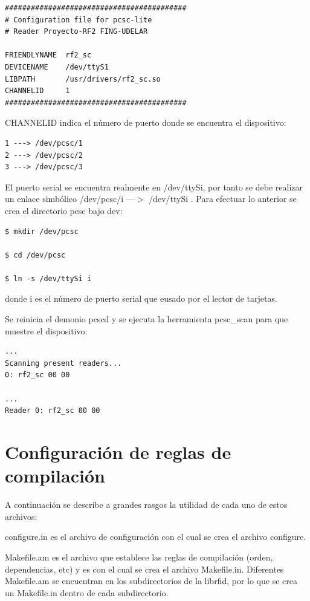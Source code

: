 \begin{verbatim}
##########################################
# Configuration file for pcsc-lite 
# Reader Proyecto-RF2 FING-UDELAR 

FRIENDLYNAME  rf2_sc 
DEVICENAME    /dev/ttyS1 
LIBPATH       /usr/drivers/rf2_sc.so 
CHANNELID     1 
##########################################
\end{verbatim}

CHANNELID indica el número de puerto donde se encuentra el dispositivo: 

\begin{verbatim}
1 ---> /dev/pcsc/1 
2 ---> /dev/pcsc/2 
3 ---> /dev/pcsc/3 
\end{verbatim}

El puerto serial se encuentra realmente en /dev/ttySi, por tanto se debe realizar un enlace simbólico /dev/pcsc/i ---$>$ /dev/ttySi . Para efectuar lo anterior se crea el directorio pcsc bajo dev: 

\begin{verbatim}
$ mkdir /dev/pcsc

$ cd /dev/pcsc

$ ln -s /dev/ttySi i
\end{verbatim}

donde i es el número de puerto serial que eusado por el lector de tarjetas. 

\bigskip
Se reinicia el demonio pcscd y se ejecuta la herramienta pcsc\_scan para que muestre el dispositivo: 

\begin{verbatim}
...	
Scanning present readers... 
0: rf2_sc 00 00 

... 
Reader 0: rf2_sc 00 00 
\end{verbatim}

\newpage
\section{Configuración de reglas de compilación}\label{makefile}

A continuación se describe a grandes rasgos la utilidad de cada uno de estos archivos:

\bigskip
configure.in es el archivo de configuración con el cual se crea el archivo configure.


Makefile.am es el archivo que establece las reglas de compilación (orden, dependencias, etc) y es con el cual se crea el archivo Makefile.in. Diferentes Makefile.am se encuentran en los subdirectorios de la librfid, por lo que se crea un Makefile.in dentro de cada subdirectorio.


